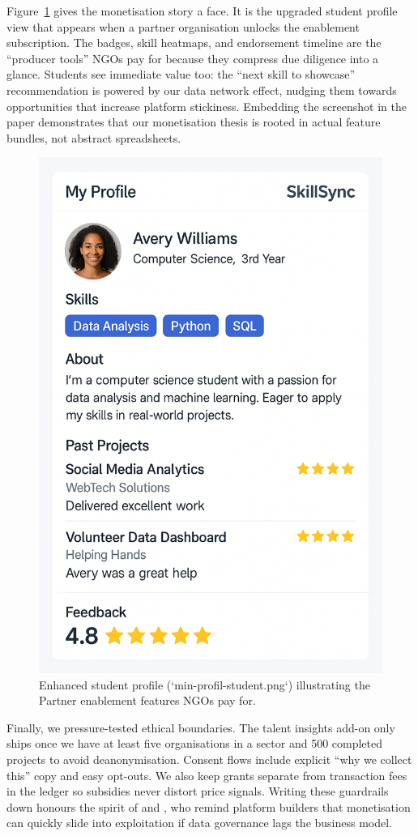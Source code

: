 Figure~\ref{fig:student-profile} gives the monetisation story a face. It is the upgraded student profile view that appears when a partner organisation unlocks the enablement subscription. The badges, skill heatmaps, and endorsement timeline are the ``producer tools'' NGOs pay for because they compress due diligence into a glance. Students see immediate value too: the ``next skill to showcase'' recommendation is powered by our data network effect, nudging them towards opportunities that increase platform stickiness. Embedding the screenshot in the paper demonstrates that our monetisation thesis is rooted in actual feature bundles, not abstract spreadsheets.

\begin{figure}[h]
  \centering
  \includegraphics[width=0.8\linewidth]{figures/opgave04/min-profil-student.png}
  \caption{Enhanced student profile (`min-profil-student.png`) illustrating the Partner enablement features NGOs pay for.}
  \label{fig:student-profile}
\end{figure}

Finally, we pressure-tested ethical boundaries. The talent insights add-on only ships once we have at least five organisations in a sector and 500 completed projects to avoid deanonymisation. Consent flows include explicit ``why we collect this'' copy and easy opt-outs. We also keep grants separate from transaction fees in the ledger so subsidies never distort price signals. Writing these guardrails down honours the spirit of \citet{Zuboff2019} and \citet{Srnicek2017}, who remind platform builders that monetisation can quickly slide into exploitation if data governance lags the business model.
